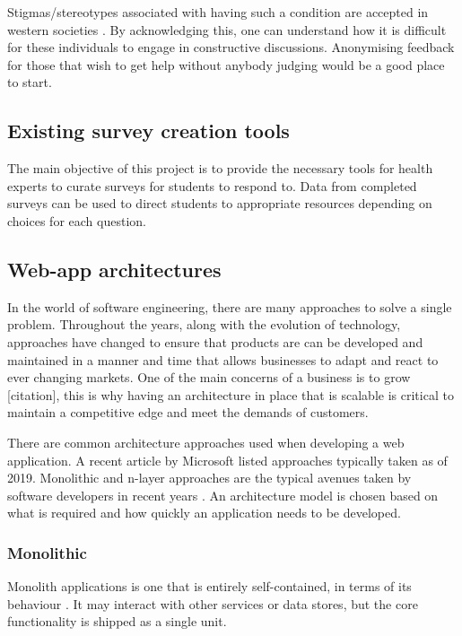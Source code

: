 Stigmas/stereotypes associated with having such a condition are accepted in western societies \cite{corrigan2002paradox}.
By acknowledging this, one can understand how it is difficult for these individuals to engage in constructive discussions.
Anonymising feedback for those that wish to get help without anybody judging would be a good place to start. 

\subsection{Existing survey creation tools}
The main objective of this project is to provide the necessary tools for health experts to curate surveys for students to respond to.
Data from completed surveys can be used to direct students to appropriate resources depending on choices for each question.


\subsection{Web-app architectures}
In the world of software engineering, there are many approaches to solve a single problem.
Throughout the years, along with the evolution of technology, approaches have changed to ensure that products are
can be developed and maintained in a manner and time that allows businesses to adapt and react to ever changing markets. 
One of the main concerns of a business is to grow [citation], this is why having an architecture in place that is scalable is
critical to maintain a competitive edge and meet the demands of customers.

There are common architecture approaches used when developing a web application.
A recent article by Microsoft listed approaches typically taken as of 2019. 
Monolithic and n-layer approaches are the typical avenues taken by software developers in recent years \cite{ardalis_common}.
An architecture model is chosen based on what is required and how quickly an application needs to be developed.

\subsubsection{Monolithic} \label{monolithic}
Monolith applications is one that is entirely self-contained, in terms of its behaviour \cite{ardalis_common}.
It may interact with other services or data stores, but the core functionality is shipped as a single unit.

